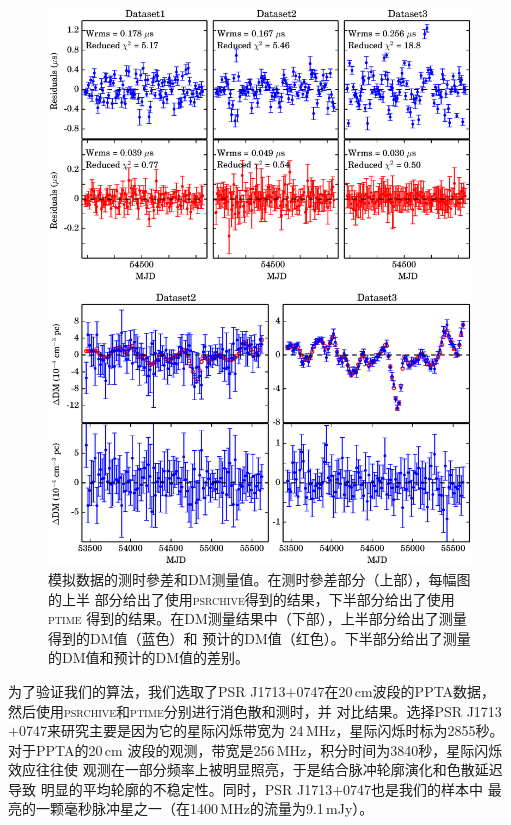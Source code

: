 \begin{figure}
\center
\includegraphics[width=5.5 in]{sim3.ps}
\caption{模拟数据的测时參差和DM测量值。在测时參差部分（上部），每幅图的上半
部分给出了使用\textsc{psrchive}得到的结果，下半部分给出了使用\textsc{ptime}
得到的结果。在DM测量结果中（下部），上半部分给出了测量得到的DM值（蓝色）和
预计的DM值（红色）。下半部分给出了测量的DM值和预计的DM值的差别。}
\label{simTiming}
\end{figure}

为了验证我们的算法，我们选取了PSR J1713$+$0747在20\,cm波段的PPTA数据，
然后使用\textsc{psrchive}和\textsc{ptime}分别进行消色散和测时，并
对比结果。选择PSR J1713$+$0747来研究主要是因为它的星际闪烁带宽为
24\,MHz，星际闪烁时标为2855秒\supercite{Keith13}。对于PPTA的20\,cm
波段的观测，带宽是256\,MHz，积分时间为3840秒，星际闪烁效应往往使
观测在一部分频率上被明显照亮，于是结合脉冲轮廓演化和色散延迟导致
明显的平均轮廓的不稳定性。同时，PSR J1713$+$0747也是我们的样本中
最亮的一颗毫秒脉冲星之一（在1400\,MHz的流量为9.1\,mJy）。

